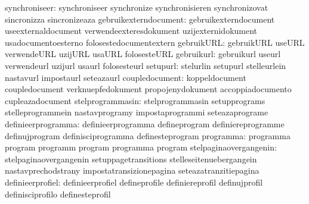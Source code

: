                    synchroniseer: synchroniseer                    synchronize
                                  synchronisieren                  synchronizovat
                                  sincronizza                      sincronizeaza
           gebruikexterndocument: gebruikexterndocument            useexternaldocument
                                  verwendeexteresdokument          uzijexternidokument
                                  usadocumentoesterno              folosestedocumentextern
                      gebruikURL: gebruikURL                       useURL
                                  verwendeURL                      uzijURL
                                  usaURL                           folosesteURL
                      gebruikurl: gebruikurl                       useurl
                                  verwendeurl                      uzijurl
                                  usaurl                           folosesteurl
                        setupurl: stelurlin                        setupurl
                                  stelleurlein                     nastavurl
                                  impostaurl                       seteazaurl
                  coupledocument: koppeldocument                   coupledocument
                                  verknuepfedokument               propojenydokument
                                  accoppiadocumento                cupleazadocument
                stelprogrammasin: stelprogrammasin                 setupprograms
                                  stelleprogrammein                nastavprogramy
                                  impostaprogrammi                 seteazaprograme
              definieerprogramma: definieerprogramma               defineprogram
                                  definiereprogramme               definujprogram
                                  definisciprogramma               definesteprogram
                       programma: programma                        program
                                  programm                         program
                                  programma                        program
          stelpaginaovergangenin: stelpaginaovergangenin           setuppagetransitions
                                  stelleseitenuebergangein         nastavprechodstrany
                                  impostatransizionepagina         seteazatranzitiepagina
                definieerprofiel: definieerprofiel                 defineprofile
                                  definiereprofil                  definujprofil
                                  definisciprofilo                 definesteprofil
